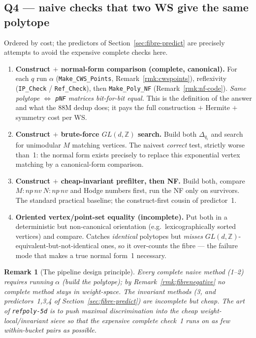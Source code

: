 \documentclass{amsart}
\newtheorem{remark}[theorem]{Remark}
\begin{document}
\subsection{Q4 --- naive checks that two WS give the same polytope}
\label{sec:fibre-naive}

Ordered by cost; the predictors of Section~\ref{sec:fibre-predict} are precisely
attempts to avoid the expensive complete checks here.

\begin{enumerate}
  \item \textbf{Construct $+$ normal-form comparison (complete, canonical).}
        For each $q$ run $\alpha$ (\texttt{Make\_CWS\_Points},
        Remark~\ref{rmk:cwspoints}), reflexivity (\texttt{IP\_Check} /
        \texttt{Ref\_Check}), then \texttt{Make\_Poly\_NF}
        (Remark~\ref{rmk:nf-code}). \emph{Same polytope $\iff$ \texttt{pNF}
        matrices bit-for-bit equal.} This is the definition of the answer and
        what the $88$M dedup does; it pays the full construction $+$ Hermite $+$
        symmetry cost per WS.
  \item \textbf{Construct $+$ brute-force $GL(d,\mathbb Z)$ search.} Build both
        $\Delta_{q_i}$ and search for unimodular $M$ matching vertices. The
        naivest \emph{correct} test, strictly worse than~1: the normal form
        exists precisely to replace this exponential vertex matching by a
        canonical-form comparison.
  \item \textbf{Construct $+$ cheap-invariant prefilter, then NF.} Build both,
        compare $M{:}np\,nv\ N{:}np\,nv$ and Hodge numbers first, run the NF
        only on survivors. The standard practical baseline; the construct-first
        cousin of predictor~1.
  \item \textbf{Oriented vertex/point-set equality (incomplete).} Put both in a
        deterministic but non-canonical orientation (e.g.\ lexicographically
        sorted vertices) and compare. Catches \emph{identical} polytopes but
        \emph{misses} $GL(d,\mathbb Z)$-equivalent-but-not-identical ones, so it
        over-counts the fibre --- the failure mode that makes a true normal
        form~1 necessary.
\end{enumerate}

\begin{remark}[The pipeline design principle]\label{rmk:fibredesign}
Every \emph{complete} naive method (1--2) requires running $\alpha$ (build the
polytope); by Remark~\ref{rmk:fibrenegative} no complete method stays in
weight-space. The invariant methods (3, and predictors~1,3,4 of
Section~\ref{sec:fibre-predict}) are incomplete but cheap. The art of
\texttt{refpoly-5d} is to push maximal discrimination into the cheap
weight-local/invariant sieve so that the expensive complete check~1 runs on as
few within-bucket pairs as possible.
\end{remark}
\end{document}
